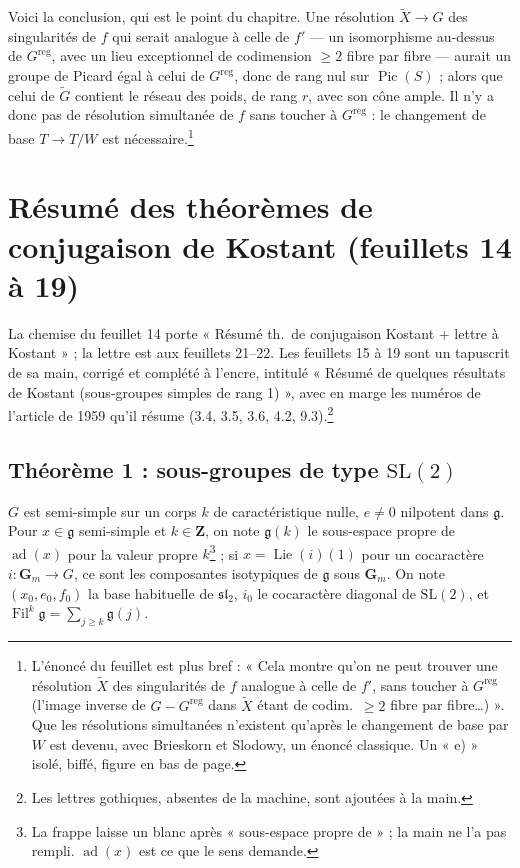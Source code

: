 \documentclass[11pt,a4paper]{article}
\begin{document}
Voici la conclusion, qui est le point du chapitre. Une résolution
$\widetilde{X}\to G$ des singularités de $f$ qui serait analogue à celle de
$f'$ — un isomorphisme au-dessus de $G^{\mathrm{reg}}$, avec un lieu
exceptionnel de codimension $\geqslant 2$ fibre par fibre — aurait un groupe
de Picard égal à celui de $G^{\mathrm{reg}}$, donc de rang nul sur
$\operatorname{Pic}(S)$ ; alors que celui de $\widetilde{G}$ contient le réseau
des poids, de rang $r$, avec son cône ample. Il n'y a donc pas de résolution
simultanée de $f$ sans toucher à $G^{\mathrm{reg}}$ : le changement de base
$T\to T/W$ est nécessaire.\footnote{L'énoncé du feuillet est plus bref :
« Cela montre qu'on ne peut trouver une résolution $\widetilde{X}$ des
singularités de $f$ analogue à celle de $f'$, sans toucher à $G^{\mathrm{reg}}$
(l'image inverse de $G-G^{\mathrm{reg}}$ dans $\widetilde{X}$ étant de codim.\
$\geqslant 2$ fibre par fibre…) ». Que les résolutions simultanées n'existent
qu'après le changement de base par $W$ est devenu, avec Brieskorn et Slodowy,
un énoncé classique. Un « e) » isolé, biffé, figure en bas de page.}

\section*{Résumé des théorèmes de conjugaison de Kostant (feuillets 14 à 19)}

La chemise du feuillet 14 porte « Résumé th.\ de conjugaison Kostant + lettre à
Kostant » ; la lettre est aux feuillets 21--22. Les feuillets 15 à 19 sont un
tapuscrit de sa main, corrigé et complété à l'encre, intitulé « Résumé de
quelques résultats de Kostant (sous-groupes simples de rang 1) », avec en marge
les numéros de l'article de 1959 qu'il résume (3.4, 3.5, 3.6, 4.2,
9.3).\footnote{Les lettres gothiques, absentes de la machine, sont ajoutées à
la main.}

\subsection*{Théorème 1 : sous-groupes de type $\mathrm{SL}(2)$}

$G$ est semi-simple sur un corps $k$ de caractéristique nulle, $e\neq 0$
nilpotent dans $\mathfrak{g}$. Pour $x\in\mathfrak{g}$ semi-simple et
$k\in\mathbf{Z}$, on note $\mathfrak{g}(k)$ le sous-espace propre de
$\operatorname{ad}(x)$ pour la valeur propre $k$\footnote{La frappe laisse un
blanc après « sous-espace propre de » ; la main ne l'a pas rempli.
$\operatorname{ad}(x)$ est ce que le sens demande.} ; si
$x=\operatorname{Lie}(i)(1)$ pour un cocaractère
$i\colon\mathbf{G}_{m}\to G$, ce sont les composantes isotypiques de
$\mathfrak{g}$ sous $\mathbf{G}_{m}$. On note $(x_{0},e_{0},f_{0})$ la base
habituelle de $\mathfrak{sl}_{2}$, $i_{0}$ le cocaractère diagonal de
$\mathrm{SL}(2)$, et $\operatorname{Fil}^{k}\mathfrak{g}=
\sum_{j\geqslant k}\mathfrak{g}(j)$.
\end{document}
